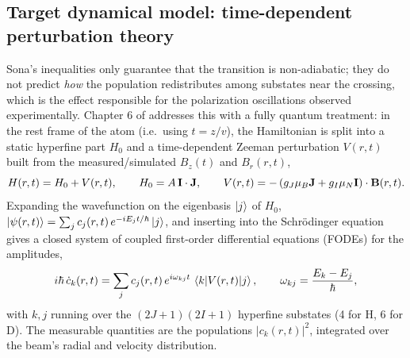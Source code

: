 \documentclass[11pt,a4paper]{article}
\begin{document}
\subsection{Target dynamical model: time-dependent perturbation theory}

Sona's inequalities only guarantee that the transition is non-adiabatic; they
do not predict \emph{how} the population redistributes among substates near
the crossing, which is the effect responsible for the polarization
oscillations observed experimentally. Chapter 6 of \cite{kannis2023}
addresses this with a fully quantum treatment: in the rest frame of the atom
(i.e.\ using $t = z/v$), the Hamiltonian is split into a static hyperfine
part $H_0$ and a time-dependent Zeeman perturbation $V(r,t)$ built from the
measured/simulated $B_z(t)$ and $B_r(r,t)$,
\begin{equation}
    H(r,t) = H_0 + V(r,t), \qquad
    H_0 = A\,\vb{I}\cdot\vb{J}, \qquad
    V(r,t) = -\left(g_J\mu_B \vb{J} + g_I\mu_N \vb{I}\right)\cdot\vb{B}(r,t).
    \label{eq:fullH}
\end{equation}
Expanding the wavefunction on the eigenbasis $\ket{j}$ of $H_0$,
$\ket{\psi(r,t)} = \sum_j c_j(r,t)\, e^{-iE_j t/\hbar}\ket{j}$, and inserting
into the Schr\"odinger equation gives a closed system of coupled first-order
differential equations (FODEs) for the amplitudes,
\begin{equation}
    i\hbar\, \dot{c}_k(r,t) = \sum_{j} c_j(r,t)\, e^{i\omega_{kj}t}\,
    \mel{k}{V(r,t)}{j}, \qquad \omega_{kj} = \frac{E_k-E_j}{\hbar},
    \label{eq:fode}
\end{equation}
with $k,j$ running over the $(2J{+}1)(2I{+}1)$ hyperfine substates (4 for H,
6 for D). The measurable quantities are the populations $|c_k(r,t)|^2$,
integrated over the beam's radial and velocity distribution.
\end{document}
